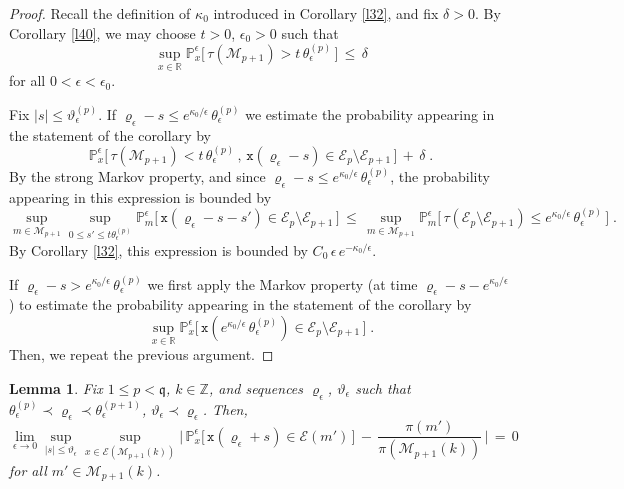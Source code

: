 \documentclass[reqno]{amsart}
\theoremstyle{plain}
\newtheorem{lemma}[theorem]{Lemma}
\theoremstyle{definition}
\newcommand{\mf}[1]{{\mathfrak #1}}
\newcommand{\bb}[1]{{\mathbb #1}}
\newcommand{\ms}[1]{{\mathscr #1}}
\newcommand{\mtt}[1]{{\mathtt #1}}
\newcommand{\<}{\langle}
\renewcommand{\>}{\rangle}
\begin{document}
\begin{proof}
Recall the definition of $\kappa_0$ introduced in Corollary \ref{l32},
and fix $\delta>0$. By Corollary \ref{l40}, we may choose $t>0$,
$\epsilon_0>0$ such
that
\begin{equation*}
\sup_{x\in \bb R} \bb P^{\epsilon}_x\big[ \, 
\tau (\ms M_{p+1}) > t \, \theta^{(p)}_\epsilon  \, \big] \,\le \, \delta
\end{equation*}
for all $0<\epsilon<\epsilon_0$.

Fix $|s| \le \vartheta^{(p)}_\epsilon$. If
$\varrho_\epsilon - s \le e^{\kappa_0/\epsilon} \,
\theta^{(p)}_\epsilon$ we estimate the probability appearing in the
statement of the corollary by
\begin{equation*}
\bb P^{\epsilon}_x\big[ \, \tau (\ms M_{p+1}) < t\,
\theta^{(p)}_\epsilon \,,\,
\mtt x(\varrho_\epsilon - s) \in \ms E_p
\setminus \ms E_{p+1} \,\big] \,+\, \delta \;.
\end{equation*}
By the strong Markov property, and since
$\varrho_\epsilon - s \le e^{\kappa_0/\epsilon} \,
\theta^{(p)}_\epsilon$, the probability appearing in this expression
is bounded by
\begin{equation*}
\sup_{m\in \ms M_{p+1}}
\sup_{0\le s'  \le t\theta^{(p)}_\epsilon }
\bb P^{\epsilon}_m\big[ \, 
\mtt x(\varrho_\epsilon - s - s') \in \ms E_p
\setminus \ms E_{p+1} \,\big] \,\le\,
\sup_{m\in \ms M_{p+1}} \bb P^{\epsilon}_m\big[ \, 
\tau(\ms E_p \setminus \ms E_{p+1}) \le e^{\kappa_0/\epsilon} \,
\theta^{(p)}_\epsilon \,\big] \;.
\end{equation*}
By Corollary \ref{l32}, this expression is bounded by $C_0 \,\epsilon \,
e^{-\kappa_0/\epsilon}$.

If
$\varrho_\epsilon - s > e^{\kappa_0/\epsilon} \,
\theta^{(p)}_\epsilon$ we first apply the Markov property (at time
$\varrho_\epsilon - s - e^{\kappa_0/\epsilon}$) to estimate the
probability appearing in the statement of the corollary by
\begin{equation*}
\sup_{x\in \bb R}
\bb P^{\epsilon}_x\big[ \, 
\mtt x(e^{\kappa_0/\epsilon} \, \theta^{(p)}_\epsilon) \in \ms E_p
\setminus \ms E_{p+1} \,\big]\;.
\end{equation*}
Then, we repeat the previous argument.
\end{proof}


\begin{lemma}
\label{l38}
Fix $1\le p< \mf q$, $k\in \bb Z$, and sequences $\varrho_\epsilon$,
$\vartheta_\epsilon$ such that
$\theta^{(p)}_\epsilon \prec \varrho_\epsilon \prec
\theta^{(p+1)}_\epsilon$, $\vartheta_\epsilon\prec \varrho_\epsilon$.
Then,
\begin{equation*}
\lim_{\epsilon\to 0} \sup_{|s|\le \vartheta_\epsilon} \sup_{x\in \ms E(\ms M_{p+1}(k))}
\Big|\,  \bb P^{\epsilon}_x\big[ \, 
\mtt x(\varrho_\epsilon + s) \in \ms E(m') \, \big]
\,-\, \frac{\pi(m')}{\pi(\ms M_{p+1}(k))} \,\Big| \,=\, 0
\end{equation*}
for all $m'\in \ms M_{p+1}(k)$.
\end{lemma}
\end{document}
